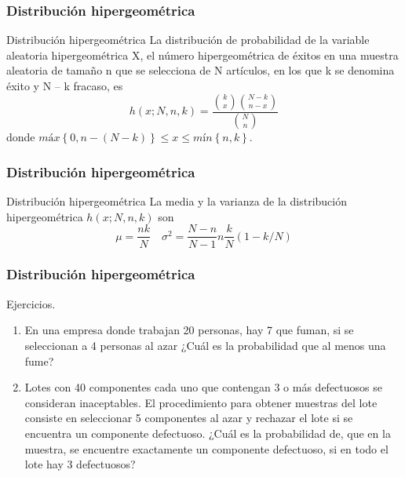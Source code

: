 \documentclass[spanish]{beamer}
\begin{document}
\begin{frame}
\frametitle{Distribución hipergeométrica}  
\begin{block}{Distribución hipergeométrica}
La distribución de probabilidad de la variable aleatoria hipergeométrica X, el número hipergeométrica de éxitos en una muestra aleatoria de tamaño n que se selecciona de N artículos, en los que k se denomina éxito y N – k fracaso, es
\begin{equation*}
h(x; N, n, k)=\frac{\binom{k}{x}\binom{N-k}{n-x}}{\binom{N}{n}}
\end{equation*}
donde $máx \left\lbrace 0, n- (N - k ) \right\rbrace  \leq x \leq mín \left\lbrace n, k \right\rbrace $.
\end{block}
\end{frame}
\begin{frame}
\frametitle{Distribución hipergeométrica}  
\begin{block}{Distribución hipergeométrica}
La media y la varianza de la distribución hipergeométrica $h(x; N, n, k)$ son
\begin{equation*}
\mu = \frac{nk}{N}  \quad  \sigma^{2}=\frac{N-n}{N-1} n \frac{k}{N} (1- k/N)
\end{equation*}
\end{block}

\end{frame}


\begin{frame}
\frametitle{Distribución hipergeométrica}  
Ejercicios. 
\begin{enumerate}
\item En una empresa donde trabajan 20 personas, hay 7 que fuman, si se seleccionan a 4 personas al azar ¿Cuál es la probabilidad que al menos una fume?
\item Lotes con 40 componentes cada uno que contengan 3 o más defectuosos se consideran
inaceptables. El procedimiento para obtener muestras del lote consiste en seleccionar 5
componentes al azar y rechazar el lote si se encuentra un componente defectuoso. ¿Cuál
es la probabilidad de, que en la muestra, se encuentre exactamente un componente defectuoso, si en todo el lote hay 3 defectuosos?
\end{enumerate}
\end{frame}
\end{document}
